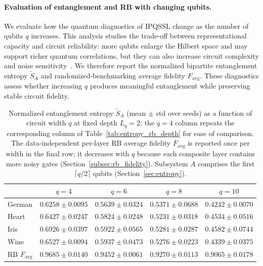 \documentclass[11pt,a4paper]{article}
\begin{document}
\paragraph{Evaluation of entanglement and RB with changing qubits.}\label{subsec:wine_results}

We evaluate how the quantum diagnostics of IPQSSL change as the number of qubits $q$ increases. This analysis studies the trade-off between representational capacity and circuit reliability: more qubits enlarge the Hilbert space and may support richer quantum correlations, but they can also increase circuit complexity and noise sensitivity~\cite{mcclean2018barren,cerezo2021cost,holmes2022connecting}.
We therefore report the normalized bipartite entanglement entropy $\widetilde{S}_A$ and randomized-benchmarking average fidelity $F_{\mathrm{avg}}$. These diagnostics assess whether increasing $q$ produces meaningful entanglement while preserving stable circuit fidelity.

\begin{table}[H]
  \centering
  \caption{Normalized entanglement entropy $\widetilde{S}_A$ (mean $\pm$
  std over seeds) as a function of circuit width $q$ at fixed depth
  $L_q=2$; the $q=4$ column repeats the corresponding column of
  Table~\ref{tab:entropy_rb_depth} for ease of comparison. The
  data-independent per-layer RB average fidelity $F_{\mathrm{avg}}$ is
  reported once per width in the final row; it decreases with $q$
  because each composite layer contains more noisy gates
  (Section~\ref{subsec:rb_fidelity}). Subsystem $A$ comprises the first
  $\lceil q/2\rceil$ qubits (Section~\ref{sec:entropy}).}
  \label{tab:entropy_rb_width}
  \small
  \begin{tabular}{l cccc}
    \toprule
    & $q=4$ & $q=6$ & $q=8$ & $q=10$ \\
    \midrule
    German & $0.6258 \pm 0.0095$ & $0.5639 \pm 0.0324$ & $0.5371 \pm 0.0688$ & $0.4242 \pm 0.0070$ \\
    Heart  & $0.6427 \pm 0.0247$ & $0.5824 \pm 0.0248$ & $0.5231 \pm 0.0318$ & $0.4534 \pm 0.0516$ \\
    Iris   & $0.6926 \pm 0.0397$ & $0.5922 \pm 0.0565$ & $0.5281 \pm 0.0287$ & $0.4582 \pm 0.0744$ \\
    Wine   & $0.6527 \pm 0.0094$ & $0.5937 \pm 0.0473$ & $0.5276 \pm 0.0223$ & $0.4339 \pm 0.0375$ \\
    \midrule
    RB $F_{\mathrm{avg}}$ & $0.9685 \pm 0.0140$ & $0.9452 \pm 0.0061$ & $0.9270 \pm 0.0113$ & $0.9065 \pm 0.0178$ \\
    \bottomrule
  \end{tabular}
\end{table}
\end{document}
